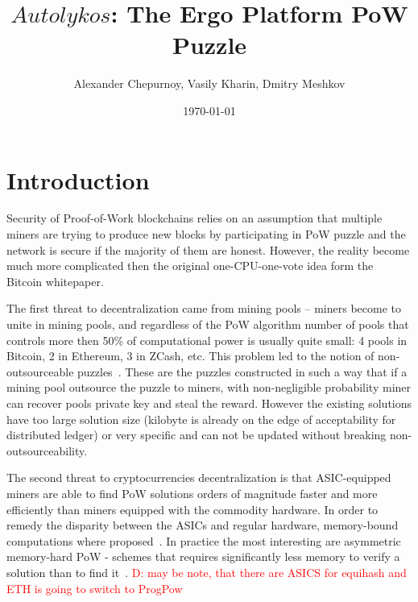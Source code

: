 \documentclass[]{article}
\newcommand{\dnote}[1]{\textcolor{red}{D: {#1}}}
\newcommand{\Name}{$Autolykos$}
\begin{document}
    \title{\Name: The Ergo Platform PoW Puzzle}

    \author{Alexander Chepurnoy, Vasily Kharin, Dmitry Meshkov}

    \date{\today}
    \maketitle



    \section{Introduction}

    Security of Proof-of-Work blockchains relies on an assumption
    that multiple miners are trying to produce new blocks by
    participating in PoW puzzle and the network is secure if the
    majority of them are honest. However, the reality become much more complicated
    then the original one-CPU-one-vote idea form the Bitcoin whitepaper\cite{nakamoto2008bitcoin}.

    The first threat to decentralization came from mining pools -- miners become to unite in mining pools,
    and regardless of the PoW algorithm number of pools that controls more then 50\% of
    computational power is usually quite small: 4 pools in Bitcoin, 2 in Ethereum, 3 in ZCash, etc.
    This problem led to the notion of non-outsourceable puzzles~\cite{miller2015nonoutsourceable,daian2017piecework}.
    These are the puzzles constructed in such a way that if a mining pool outsource the puzzle
    to miners, with non-negligible probability miner can recover pools private key and steal the reward.
    However the existing solutions have too large solution size (kilobyte is already
    on the edge of acceptability for distributed ledger) or very specific and
    can not be updated without breaking non-outsourceability.

    The second threat to cryptocurrencies decentralization is that ASIC-equipped miners are
    able to find PoW solutions orders of magnitude faster and more efficiently
    than miners equipped with the commodity hardware. In order to remedy the
    disparity between the ASICs and regular hardware, memory-bound computations
    where proposed~\cite{dwork2003memory}. In practice the most interesting are
    asymmetric memory-hard PoW - schemes that requires significantly less memory
    to verify a solution than to find it~\cite{biryukov2017equihash,ethHash}.
    \dnote{may be note, that there are ASICS for equihash and ETH is going to switch to ProgPow}
\end{document}
